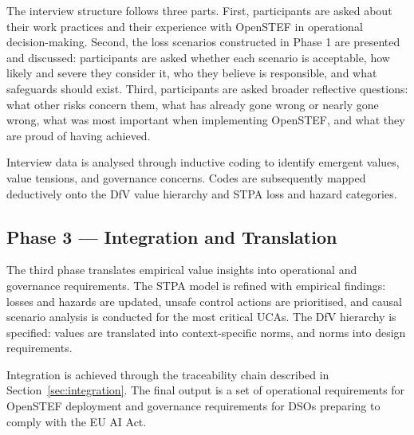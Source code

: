 The interview structure follows three parts. First, participants are asked about their work practices and their experience with OpenSTEF in operational decision-making. Second, the loss scenarios constructed in Phase 1 are presented and discussed: participants are asked whether each scenario is acceptable, how likely and severe they consider it, who they believe is responsible, and what safeguards should exist. Third, participants are asked broader reflective questions: what other risks concern them, what has already gone wrong or nearly gone wrong, what was most important when implementing OpenSTEF, and what they are proud of having achieved.

Interview data is analysed through inductive coding to identify emergent values, value tensions, and governance concerns. Codes are subsequently mapped deductively onto the DfV value hierarchy and STPA loss and hazard categories.

\subsection{Phase 3 — Integration and Translation}

The third phase translates empirical value insights into operational and governance requirements. The STPA model is refined with empirical findings: losses and hazards are updated, unsafe control actions are prioritised, and causal scenario analysis is conducted for the most critical UCAs. The DfV hierarchy is specified: values are translated into context-specific norms, and norms into design requirements.

Integration is achieved through the traceability chain described in Section~\ref{sec:integration}. The final output is a set of operational requirements for OpenSTEF deployment and governance requirements for DSOs preparing to comply with the EU AI Act.